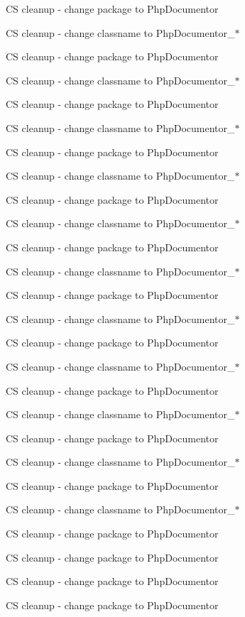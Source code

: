 \begin{DoxyRefList}
\-C\-S cleanup -\/ change package to \-Php\-Documentor 

\-C\-S cleanup -\/ change classname to \-Php\-Documentor\-\_\-$\ast$ 

\-C\-S cleanup -\/ change package to \-Php\-Documentor 

\-C\-S cleanup -\/ change classname to \-Php\-Documentor\-\_\-$\ast$ 

\-C\-S cleanup -\/ change package to \-Php\-Documentor 

\-C\-S cleanup -\/ change classname to \-Php\-Documentor\-\_\-$\ast$ 

\-C\-S cleanup -\/ change package to \-Php\-Documentor 

\-C\-S cleanup -\/ change classname to \-Php\-Documentor\-\_\-$\ast$ 

\-C\-S cleanup -\/ change package to \-Php\-Documentor 

\-C\-S cleanup -\/ change classname to \-Php\-Documentor\-\_\-$\ast$ 

\-C\-S cleanup -\/ change package to \-Php\-Documentor 

\-C\-S cleanup -\/ change classname to \-Php\-Documentor\-\_\-$\ast$ 

\-C\-S cleanup -\/ change package to \-Php\-Documentor 

\-C\-S cleanup -\/ change classname to \-Php\-Documentor\-\_\-$\ast$ 

\-C\-S cleanup -\/ change package to \-Php\-Documentor 

\-C\-S cleanup -\/ change classname to \-Php\-Documentor\-\_\-$\ast$ 

\-C\-S cleanup -\/ change package to \-Php\-Documentor 

\-C\-S cleanup -\/ change classname to \-Php\-Documentor\-\_\-$\ast$ 

\-C\-S cleanup -\/ change package to \-Php\-Documentor 

\-C\-S cleanup -\/ change classname to \-Php\-Documentor\-\_\-$\ast$ 

\-C\-S cleanup -\/ change package to \-Php\-Documentor 

\-C\-S cleanup -\/ change classname to \-Php\-Documentor\-\_\-$\ast$ 

\-C\-S cleanup -\/ change package to \-Php\-Documentor 

\-C\-S cleanup -\/ change package to \-Php\-Documentor 

\-C\-S cleanup -\/ change package to \-Php\-Documentor 

\-C\-S cleanup -\/ change package to \-Php\-Documentor 


\end{DoxyRefList}
